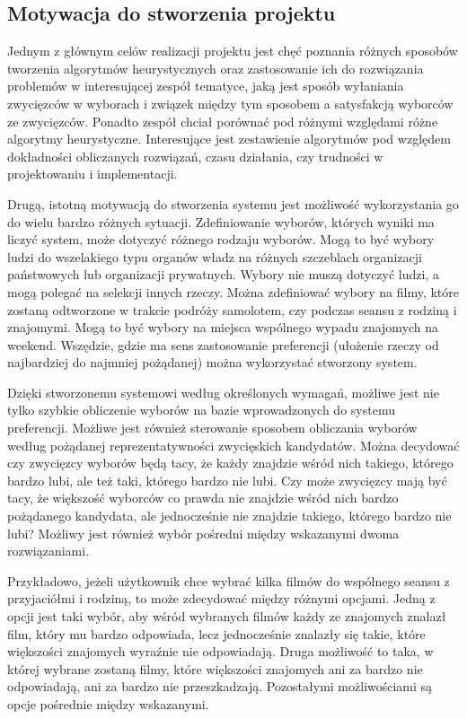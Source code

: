 \documentclass[polish,11pt]{aghthesis}
\begin{document}

\subsection{Motywacja do stworzenia projektu}
Jednym z głównym celów realizacji projektu jest chęć poznania różnych sposobów tworzenia
algorytmów heurystycznych oraz zastosowanie ich do rozwiązania problemów w
interesującej zespół tematyce, jaką jest sposób wyłaniania zwycięzców w wyborach i
związek między tym sposobem a satysfakcją wyborców ze zwycięzców. Ponadto zespół
chciał porównać pod różnymi względami różne algorytmy heurystyczne. Interesujące jest
zestawienie algorytmów pod względem dokładności obliczanych rozwiązań, czasu działania,
czy trudności w projektowaniu i implementacji. 

Drugą, istotną motywacją do stworzenia systemu jest możliwość wykorzystania go do wielu
bardzo różnych sytuacji. Zdefiniowanie wyborów, których wyniki ma liczyć system, może
dotyczyć różnego rodzaju wyborów. Mogą to być wybory ludzi do wszelakiego typu organów
władz na różnych szczeblach organizacji państwowych lub organizacji prywatnych. Wybory
nie muszą dotyczyć ludzi, a mogą polegać na selekcji innych rzeczy. Można zdefiniować
wybory na filmy, które zostaną odtworzone w trakcie podróży samolotem, czy podczas
seansu z rodziną i znajomymi. Mogą to być wybory na miejsca wspólnego wypadu znajomych na weekend. Wszędzie, gdzie ma sens zastosowanie preferencji (ułożenie
rzeczy od najbardziej do najmniej pożądanej) można wykorzystać stworzony system.

Dzięki stworzonemu systemowi według określonych wymagań, możliwe jest nie tylko
szybkie obliczenie wyborów na bazie wprowadzonych do systemu preferencji. Możliwe jest również
sterowanie sposobem obliczania wyborów według pożądanej reprezentatywności
zwycięskich kandydatów. Można decydować czy zwycięzcy wyborów będą tacy, że każdy
znajdzie wśród nich takiego, którego bardzo lubi, ale też taki, którego bardzo nie lubi. Czy
może zwycięzcy mają być tacy, że większość wyborców co prawda nie znajdzie wśród nich
bardzo pożądanego kandydata, ale jednocześnie nie znajdzie takiego, którego bardzo nie
lubi? Możliwy jest również wybór pośredni między wskazanymi dwoma rozwiązaniami.

Przykładowo, jeżeli użytkownik chce wybrać kilka filmów do wspólnego seansu z
przyjaciółmi i rodziną, to może zdecydować między różnymi opcjami. Jedną z opcji jest taki
wybór, aby wśród wybranych filmów każdy ze znajomych znalazł film, który mu bardzo
odpowiada, lecz jednocześnie znalazły się takie, które większości znajomych wyraźnie nie
odpowiadają. Druga możliwość to taka, w której wybrane zostaną filmy, które większości
znajomych ani za bardzo nie odpowiadają, ani za bardzo nie przeszkadzają. Pozostałymi
możliwościami są opcje pośrednie między wskazanymi.
\clearpage
\end{document}
